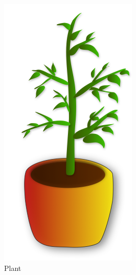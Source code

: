     \begin{figure}
      \caption[Icon Types]{\textbf{Icon Types}
        (a) Plants represent progress.
        (b) Birds represent wellness or general status.
        (c) Hamsters represent activity or arousal.
      }
      \centering
      \begin{subfigure}[b]{0.3\textwidth}
        \includegraphics[width=.7\textwidth]{ic_plant2.png}
         \caption{Plant}
      \end{subfigure}
      \begin{subfigure}[b]{0.3\textwidth}

\end{subfigure}
\end{figure}
